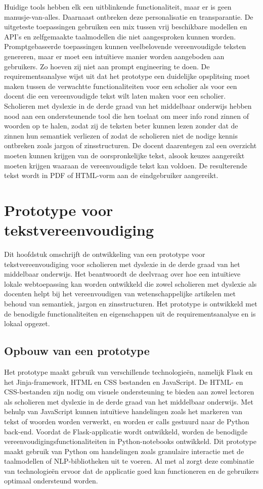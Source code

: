 Huidige tools hebben elk een uitblinkende functionaliteit, maar er is geen manusje-van-alles. Daarnaast ontbreken deze personalisatie en transparantie. De uitgeteste toepassingen gebruiken een mix tussen vrij beschikbare modellen en API's en zelfgemaakte taalmodellen die niet aangesproken kunnen worden. Promptgebaseerde toepassingen kunnen veelbelovende vereenvoudigde teksten genereren, maar er moet een intuïtieve manier worden aangeboden aan gebruikers. Zo hoeven zij niet aan prompt engineering te doen. De requirementsanalyse wijst uit dat het prototype een duidelijke opsplitsing moet maken tussen de verwachtte functionaliteiten voor een scholier als voor een docent die een vereenvoudigde tekst wilt laten maken voor een scholier. Scholieren met dyslexie in de derde graad van het middelbaar onderwijs hebben nood aan een ondersteunende tool die hen toelaat om meer info rond zinnen of woorden op te halen, zodat zij de teksten beter kunnen lezen zonder dat de zinnen hun semantiek verliezen of zodat de scholieren niet de nodige kennis ontbreken zoals jargon of zinsstructuren. De docent daarentegen zal een overzicht moeten kunnen krijgen van de oorspronkelijke tekst, alsook keuzes aangereikt moeten krijgen waaraan de vereenvoudigde tekst kan voldoen. De resulterende tekst wordt in PDF of HTML-vorm aan de eindgebruiker aangereikt.

\chapter{Prototype voor tekstvereenvoudiging}

Dit hoofdstuk omschrijft de ontwikkeling van een prototype voor tekstvereenvoudiging voor scholieren met dyslexie in de derde graad van het middelbaar onderwijs. Het beantwoordt de deelvraag over hoe een intuïtieve lokale webtoepassing kan worden ontwikkeld die zowel scholieren met dyslexie als docenten helpt bij het vereenvoudigen van wetenschappelijke artikelen met behoud van semantiek, jargon en zinsstructuren. Het prototype is ontwikkeld met de benodigde functionaliteiten en eigenschappen uit de requirementsanalyse en is lokaal opgezet.

\section{Opbouw van een prototype}

Het prototype maakt gebruik van verschillende technologieën, namelijk Flask en het Jinja-framework, HTML en CSS bestanden en JavaScript. De HTML- en CSS-bestanden zijn nodig om visuele ondersteuning te bieden aan zowel lectoren als scholieren met dyslexie in de derde graad van het middelbaar onderwijs. Met behulp van JavaScript kunnen intuïtieve handelingen zoals het markeren van tekst of woorden worden verwerkt, en worden er calls gestuurd naar de Python back-end. Voordat de Flask-applicatie wordt ontwikkeld, worden de benodigde vereenvoudigingsfunctionaliteiten in Python-notebooks ontwikkeld. Dit prototype maakt gebruik van Python om handelingen zoals granulaire interactie met de taalmodellen of NLP-bibliotheken uit te voeren. Al met al zorgt deze combinatie van technologieën ervoor dat de applicatie goed kan functioneren en de gebruikers optimaal ondersteund worden.

